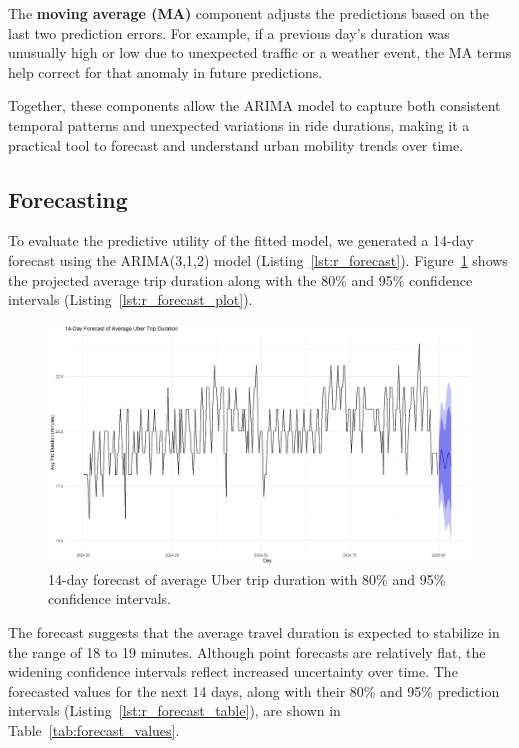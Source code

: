 \documentclass{article}
\begin{document}
The \textbf{moving average (MA)} component adjusts the predictions based on the last two prediction errors. For example, if a previous day's duration was unusually high or low due to unexpected traffic or a weather event, the MA terms help correct for that anomaly in future predictions.

Together, these components allow the ARIMA model to capture both consistent temporal patterns and unexpected variations in ride durations, making it a practical tool to forecast and understand urban mobility trends over time.


\subsection{Forecasting}

To evaluate the predictive utility of the fitted model, we generated a 14-day forecast using the ARIMA(3,1,2) model (Listing~\ref{lst:r_forecast}). Figure~\ref{fig:forecast_plot} shows the projected average trip duration along with the 80\% and 95\% confidence intervals (Listing~\ref{lst:r_forecast_plot}).

\begin{figure}
  \includegraphics[width=\textwidth]{finalproject/images/forecast-plot.png}
  \caption{14-day forecast of average Uber trip duration with 80\% and 95\% confidence intervals.}
  \label{fig:forecast_plot}
\end{figure}

The forecast suggests that the average travel duration is expected to stabilize in the range of 18 to 19 minutes. Although point forecasts are relatively flat, the widening confidence intervals reflect increased uncertainty over time. The forecasted values for the next 14 days, along with their 80\% and 95\% prediction intervals (Listing~\ref{lst:r_forecast_table}), are shown in Table~\ref{tab:forecast_values}.
\end{document}
